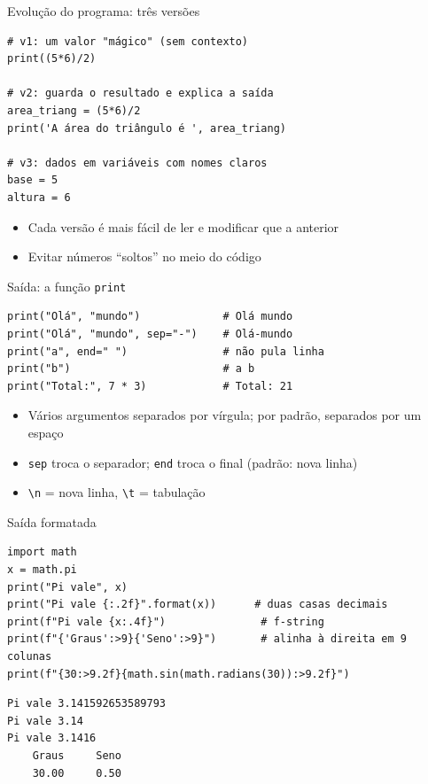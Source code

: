 \documentclass[aspectratio=169,10pt,t]{beamer}
\begin{document}
\begin{frame}[fragile]{Evolução do programa: três versões}
\begin{lstlisting}
# v1: um valor "mágico" (sem contexto)
print((5*6)/2)

# v2: guarda o resultado e explica a saída
area_triang = (5*6)/2
print('A área do triângulo é ', area_triang)

# v3: dados em variáveis com nomes claros
base = 5
altura = 6
\end{lstlisting}
  \begin{itemize}
    \item Cada versão é mais fácil de \alert{ler e modificar} que a anterior
    \item Evitar números ``soltos'' no meio do código
  \end{itemize}
\end{frame}

\begin{frame}[fragile]{Saída: a função \texttt{print}}
\begin{lstlisting}
print("Olá", "mundo")             # Olá mundo
print("Olá", "mundo", sep="-")    # Olá-mundo
print("a", end=" ")               # não pula linha
print("b")                        # a b
print("Total:", 7 * 3)            # Total: 21
\end{lstlisting}
  \begin{itemize}
    \item Vários argumentos separados por vírgula; por padrão, separados por um espaço
    \item \texttt{sep} troca o separador; \texttt{end} troca o final (padrão: nova linha)
    \item \texttt{\textbackslash n} = nova linha, \texttt{\textbackslash t} = tabulação
  \end{itemize}
\end{frame}

\begin{frame}[fragile]{Saída formatada}
\begin{lstlisting}
import math
x = math.pi
print("Pi vale", x)
print("Pi vale {:.2f}".format(x))      # duas casas decimais
print(f"Pi vale {x:.4f}")               # f-string
print(f"{'Graus':>9}{'Seno':>9}")       # alinha à direita em 9 colunas
print(f"{30:>9.2f}{math.sin(math.radians(30)):>9.2f}")
\end{lstlisting}
\begin{lstlisting}[style=saida]
Pi vale 3.141592653589793
Pi vale 3.14
Pi vale 3.1416
    Graus     Seno
    30.00     0.50
\end{lstlisting}
\end{frame}
\end{document}

